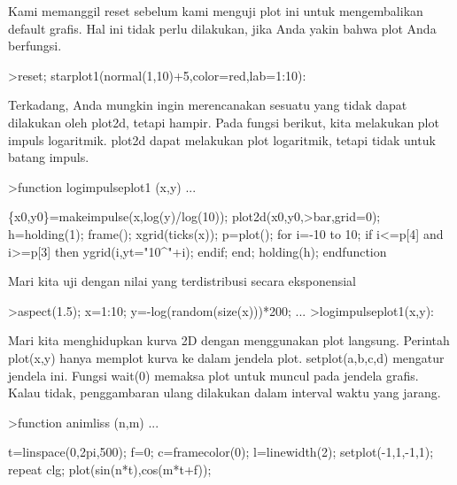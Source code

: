 \documentclass[a4paper,10pt]{article}
\begin{document}
\begin{eulernotebook}
\begin{eulercomment}
\begin{eulercomment}
\begin{eulercomment}
Kami memanggil reset sebelum kami menguji plot ini untuk mengembalikan
default grafis. Hal ini tidak perlu dilakukan, jika Anda yakin bahwa
plot Anda berfungsi.
\end{eulercomment}
\begin{eulerprompt}
>reset; starplot1(normal(1,10)+5,color=red,lab=1:10):
\end{eulerprompt}
\begin{eulercomment}
Terkadang, Anda mungkin ingin merencanakan sesuatu yang tidak dapat
dilakukan oleh plot2d, tetapi hampir. Pada fungsi berikut, kita
melakukan plot impuls logaritmik. plot2d dapat melakukan plot
logaritmik, tetapi tidak untuk batang impuls.
\end{eulercomment}
\begin{eulerprompt}
>function logimpulseplot1 (x,y) ...
\end{eulerprompt}
\begin{eulerudf}
    \{x0,y0\}=makeimpulse(x,log(y)/log(10));
    plot2d(x0,y0,>bar,grid=0);
    h=holding(1);  
    frame();
    xgrid(ticks(x));
    p=plot();
    for i=-10 to 10;
      if i<=p[4] and i>=p[3] then
         ygrid(i,yt="10^"+i);
      endif;
    end;
    holding(h);
  endfunction
\end{eulerudf}
\begin{eulercomment}
Mari kita uji dengan nilai yang terdistribusi secara eksponensial
\end{eulercomment}
\begin{eulerprompt}
>aspect(1.5); x=1:10; y=-log(random(size(x)))*200; ...
>logimpulseplot1(x,y):
\end{eulerprompt}
\begin{eulercomment}
Mari kita menghidupkan kurva 2D dengan menggunakan plot langsung.
Perintah plot(x,y) hanya memplot kurva ke dalam jendela plot.
setplot(a,b,c,d) mengatur jendela ini. Fungsi wait(0) memaksa plot
untuk muncul pada jendela grafis. Kalau tidak, penggambaran ulang
dilakukan dalam interval waktu yang jarang.
\end{eulercomment}
\begin{eulerprompt}
>function animliss (n,m) ...
\end{eulerprompt}
\begin{eulerudf}
  t=linspace(0,2pi,500);
  f=0;
  c=framecolor(0);
  l=linewidth(2);
  setplot(-1,1,-1,1);
  repeat
    clg;
    plot(sin(n*t),cos(m*t+f));

\end{eulerudf}
\end{eulercomment}
\end{eulercomment}
\end{eulernotebook}
\end{document}
